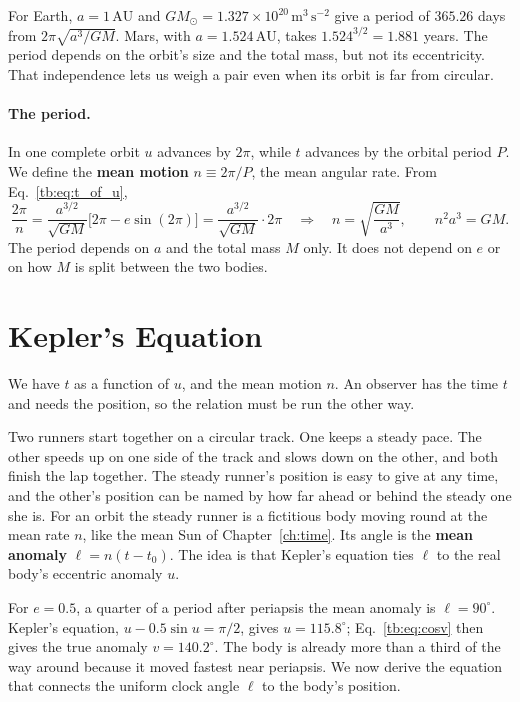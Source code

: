 	For Earth, $a=1\,\mathrm{AU}$ and $GM_\odot=1.327\times10^{20}\,\mathrm{m^3\,s^{-2}}$ give a period of $365.26$ days from $2\pi\sqrt{a^3/GM}$. Mars, with $a=1.524\,\mathrm{AU}$, takes $1.524^{3/2}=1.881$ years. The period depends on the orbit's size and the total mass, but not its eccentricity. That independence lets us weigh a pair even when its orbit is far from circular.

	\paragraph{The period.} In one complete orbit $u$ advances by $2\pi$, while $t$ advances by the orbital period $P$. We define the \textbf{mean motion} $n\equiv2\pi/P$, the mean angular rate. From Eq.~\eqref{tb:eq:t_of_u},
	\begin{equation}
		\frac{2\pi}{n} = \frac{a^{3/2}}{\sqrt{GM}}\big[2\pi - e\sin(2\pi)\big] = \frac{a^{3/2}}{\sqrt{GM}}\cdot2\pi
		\quad\Longrightarrow\quad
		\boxed{n=\sqrt{\frac{GM}{a^3}},\qquad n^2a^3=GM.} \label{eq:kepler3}
	\end{equation}
	The period depends on $a$ and the total mass $M$ only. It does not depend on $e$ or on how $M$ is split between the two bodies.

	\section{Kepler's Equation}
	\label{sec:kepler_equation}

	We have $t$ as a function of $u$, and the mean motion $n$. 	An observer has the time $t$ and needs the position, so the relation must be run the other way.

	Two runners start together on a circular track. One keeps a steady pace. The other speeds up on one side of the track and slows down on the other, and both finish the lap together. The steady runner's position is easy to give at any time, and the other's position can be named by how far ahead or behind the steady one she is. 	For an orbit the steady runner is a fictitious body moving round at the mean rate $n$, like the mean Sun of Chapter~\ref{ch:time}. Its angle is the \textbf{mean anomaly} $\ell=n(t-t_0)$. The idea is that Kepler's equation ties $\ell$ to the real body's eccentric anomaly $u$.

	For $e=0.5$, a quarter of a period after periapsis the mean anomaly is $\ell=90^\circ$. Kepler's equation, $u-0.5\sin u=\pi/2$, gives $u=115.8^\circ$; Eq.~\eqref{tb:eq:cosv} then gives the true anomaly $v=140.2^\circ$. The body is already more than a third of the way around because it moved fastest near periapsis. We now derive the equation that connects the uniform clock angle $\ell$ to the body's position.

